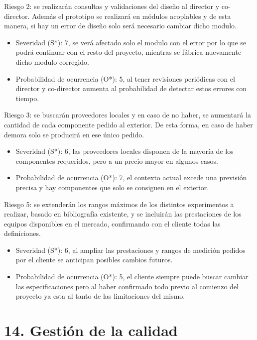 \documentclass[11pt]{charter}
\begin{document}
Riesgo 2: se realizarán consultas y validaciones del diseño al director y co-director. Además el prototipo se realizará en módulos acoplables y de esta manera, si hay un error de diseño solo será necesario cambiar dicho modulo.
\begin{itemize}
\item Severidad (S*): 7, se verá afectado solo el modulo con el error por lo que se podrá continuar con el resto del proyecto, mientras se fábrica nuevamente dicho modulo corregido.
\item Probabilidad de ocurrencia (O*): 5, al tener revisiones periódicas con el director y co-director aumenta al probabilidad de detectar estos errores con tiempo.
\end{itemize}
Riesgo 3: se buscarán proveedores locales y en caso de no haber, se aumentará la cantidad de cada componente pedido al exterior. De esta forma, en caso de haber demora solo se producirá en ese único pedido.
\begin{itemize}
\item Severidad (S*): 6, las proveedores locales disponen de la mayoría de los componentes requeridos, pero a un precio mayor en algunos casos.
\item Probabilidad de ocurrencia (O*): 7, el contexto actual excede una previsión precisa y hay componentes que solo se consiguen en el exterior.
\end{itemize}
Riesgo 5: se extenderán los rangos máximos de los distintos experimentos a realizar, basado en bibliografía existente, y se incluirán las prestaciones de los equipos disponibles en el mercado, confirmando con el cliente todas las definiciones.
\begin{itemize}
\item Severidad (S*): 6, al ampliar las prestaciones y rangos de medición pedidos por el cliente se anticipan posibles cambios futuros.
\item Probabilidad de ocurrencia (O*): 5, el cliente siempre puede buscar cambiar las especificaciones pero al haber confirmado todo previo al comienzo del proyecto ya esta al tanto de las limitaciones del mismo.
\end{itemize}

\section{14. Gestión de la calidad}
\label{sec:calidad}
\end{document}
